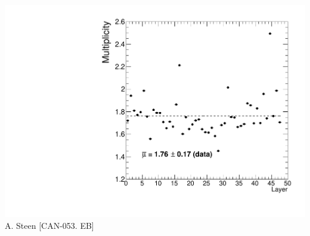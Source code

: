 \documentclass[8pt]{beamer}
\begin{document}
\begin{frame}
\begin{minipage}{0.48\linewidth}
\begin{center}
        \includegraphics[width=0.7\linewidth]{mul_2012.pdf} \\
        A. Steen [CAN-053. EB]
      \end{center}
    \end{minipage}
  \end{frame}
  
\end{document}
